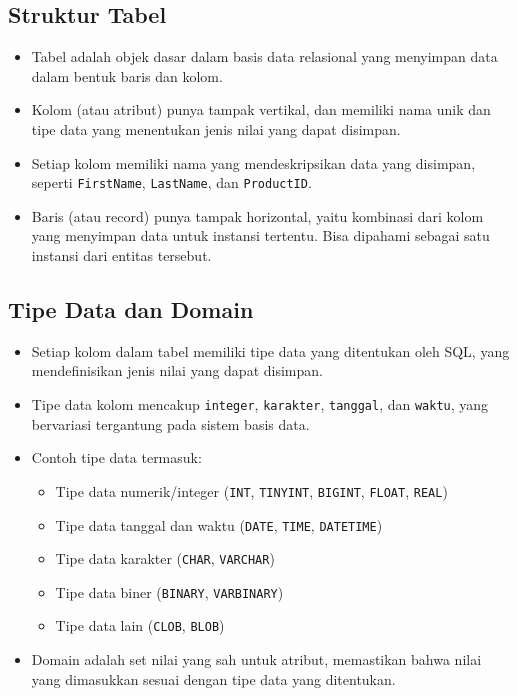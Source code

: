 \documentclass{article}
\begin{document}
\subsection{Struktur Tabel}
\begin{itemize}
    \item Tabel adalah objek dasar dalam basis data relasional yang menyimpan data dalam bentuk baris dan kolom.
    \item Kolom (atau atribut) punya tampak vertikal, dan memiliki nama unik dan tipe data yang menentukan jenis nilai yang dapat disimpan.
    \item Setiap kolom memiliki nama yang mendeskripsikan data yang disimpan, seperti \texttt{FirstName}, \texttt{LastName}, dan \texttt{ProductID}.
    \item Baris (atau record) punya tampak horizontal, yaitu kombinasi dari kolom yang menyimpan data untuk instansi tertentu. Bisa dipahami sebagai satu instansi dari entitas tersebut.
\end{itemize}

\subsection{Tipe Data dan Domain}
\begin{itemize}
    \item Setiap kolom dalam tabel memiliki tipe data yang ditentukan oleh SQL, yang mendefinisikan jenis nilai yang dapat disimpan.
    \item Tipe data kolom mencakup \texttt{integer}, \texttt{karakter}, \texttt{tanggal}, dan \texttt{waktu}, yang bervariasi tergantung pada sistem basis data.
    \item Contoh tipe data termasuk:
          \begin{itemize}
              \item Tipe data numerik/integer (\texttt{INT}, \texttt{TINYINT}, \texttt{BIGINT}, \texttt{FLOAT}, \texttt{REAL})
              \item Tipe data tanggal dan waktu (\texttt{DATE}, \texttt{TIME}, \texttt{DATETIME})
              \item Tipe data karakter (\texttt{CHAR}, \texttt{VARCHAR})
              \item Tipe data biner (\texttt{BINARY}, \texttt{VARBINARY})
              \item Tipe data lain (\texttt{CLOB}, \texttt{BLOB})
          \end{itemize}
    \item Domain adalah set nilai yang sah untuk atribut, memastikan bahwa nilai yang dimasukkan sesuai dengan tipe data yang ditentukan.
\end{itemize}
\end{document}
